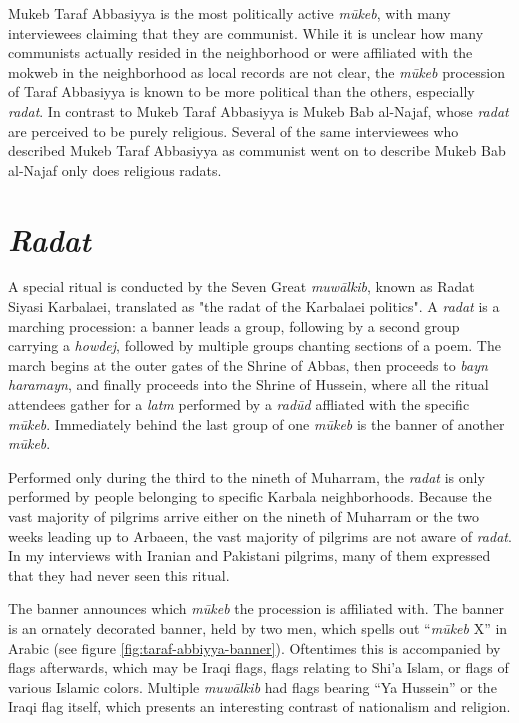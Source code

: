 Mukeb Taraf Abbasiyya is the most politically active \emph{mūkeb}, with many interviewees claiming that they are communist. While it is unclear how many communists actually resided in the neighborhood or were affiliated with the mokweb in the neighborhood as local records are not clear, the \emph{mūkeb} procession of Taraf Abbasiyya is known to be more political than the others, especially \emph{radat}. In contrast to Mukeb Taraf Abbasiyya is Mukeb Bab al-Najaf, whose \emph{radat} are perceived to be purely religious. Several of the same interviewees who described Mukeb Taraf Abbasiyya as communist went on to describe Mukeb Bab al-Najaf only does religious radats. 

\section{\emph{Radat}}
A special ritual is conducted by the Seven Great \emph{muwālkib}, known as Radat Siyasi Karbalaei, translated as "the radat of the Karbalaei politics". A \emph{radat} is a marching procession: a banner leads a group, following by a second group carrying a \emph{howdej}, followed by multiple groups chanting sections of a poem. The march begins at the outer gates of the Shrine of Abbas, then proceeds to \emph{bayn haramayn}, and finally proceeds into the Shrine of Hussein, where all the ritual attendees gather for a \emph{latm} performed by a \emph{radūd} affliated with the specific \emph{mūkeb}. Immediately behind the last group of one \emph{mūkeb} is the banner of another \emph{mūkeb}. 

Performed only during the third to the nineth of Muharram, the \emph{radat} is only performed by people belonging to specific Karbala neighborhoods. Because the vast majority of pilgrims arrive either on the nineth of Muharram or the two weeks leading up to Arbaeen, the vast majority of pilgrims are not aware of \emph{radat}. In my interviews with Iranian and Pakistani pilgrims, many of them expressed that they had never seen this ritual. 

The banner announces which \emph{mūkeb} the procession is affiliated with. The banner is an ornately decorated banner, held by two men, which spells out “\emph{mūkeb} X” in Arabic (see figure \ref{fig:taraf-abbiyya-banner}). Oftentimes this is accompanied by flags afterwards, which may be Iraqi flags, flags relating to Shi'a Islam, or flags of various Islamic colors. Multiple \emph{muwālkib} had flags bearing “Ya Hussein” or the Iraqi flag itself, which presents an interesting contrast of nationalism and religion. 

